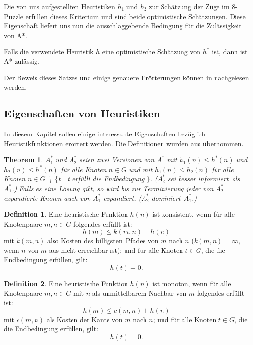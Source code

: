 Die von uns aufgestellten Heuristiken $h_{1}$ und $h_{2}$ zur Schätzung der Züge im 8-Puzzle erfüllen dieses Kriterium und sind beide optimistische Schätzungen.
Diese Eigenschaft liefert uns nun die ausschlaggebende Bedingung für die Zulässigkeit von A*.

\begin{zula}
Falls die verwendete Heuristik $h$ eine optimistische Schätzung von $h^{*}$ ist, dann ist A* zulässig.
\end{zula}

Der Beweis dieses Satzes und einige genauere Erörterungen können in \cite{kaindl} nachgelesen werden.

\subsection{Eigenschaften von Heuristiken}

In diesem Kapitel sollen einige interessante Eigenschaften bezüglich Heuristikfunktionen erörtert werden.
Die Definitionen wurden aus \cite{kaindl} übernommen.
\theoremstyle{plain} %
\newtheorem*{theor}{Theorem}
\theoremstyle{definition}
\newtheorem*{defi}{Definition}

\begin{theor}
		$A_{1}^{*}$ und $A_{2}^{*}$ seien zwei Versionen von $A^{*}$ mit $h_{1}(n) \leq h^{*}(n)$ und $h_{2}(n) \leq h^{*}(n)$ für alle Knoten $n \in G$ und mit $h_{1}(n) \leq h_{2}(n)$ für alle Knoten $n \in G$ \textbackslash \ $\{$t $|$ t erfüllt die Endbedingung $\}$. ($A_{2}^{*}$ sei \glqq besser informiert\grqq\ als $A_{1}^{*}$.) Falls es eine Lösung gibt, so wird bis zur Terminierung jeder von $A_{2}^{*}$ expandierte Knoten auch von $A_{1}^{*}$ expandiert, ($A_{2}^{*}$ \glqq dominiert\grqq\ $A_{1}^{*}$.)
\end{theor}

\begin{defi}
	Eine heuristische Funktion $h(n)$ ist konsistent, wenn für alle Knotenpaare $m,n \in G$ folgendes erfüllt ist: \[h(m)\leq k(m,n)+h(n)\] mit $k(m,n)$ also Kosten des \glqq billigsten\grqq\ Pfades von $m$ nach $n$ ($k(m,n) = \infty$, wenn $n$ von $m$ aus nicht erreichbar ist); und für alle Knoten $t \in G$, die die Endbedingung erfüllen, gilt: \[h(t)=0\textrm{.}\]
\end{defi}

\begin{defi}
	Eine heuristische Funktion $h(n)$ ist monoton, wenn für alle Knotenpaare $m,n \in G$ mit $n$ als unmittelbarem Nachbar von $m$ folgendes erfüllt ist: \[h(m)\leq c(m,n)+h(n)\] mit $c(m,n)$ als Kosten der Kante von $m$ nach $n$; und für alle Knoten $t \in G$, die die Endbedingung erfüllen, gilt: \[h(t)=0\textrm{.}\]
\end{defi}

